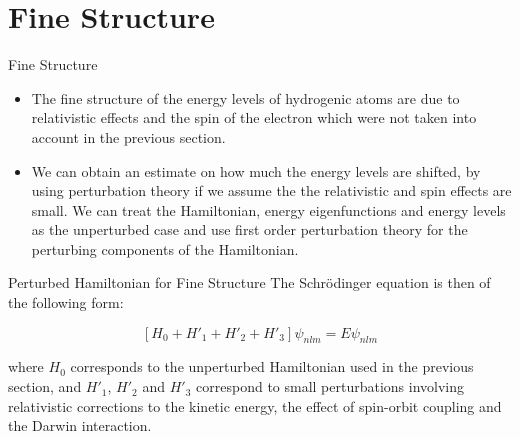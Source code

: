 \documentclass[xcolor=dvipsnames,t]{beamer}
\begin{document}

\section{Fine Structure}
    \begin{frame}{Fine Structure} 

    \begin{itemize} 

    \item The fine structure of the energy levels of hydrogenic atoms are due to relativistic
    effects and the spin of the electron which were not taken into account in the previous
    section. 
    
    \item We can obtain an estimate on how much the energy levels are shifted, by 
    using perturbation theory if we assume the the relativistic and spin effects are 
    small. We can treat the Hamiltonian, energy eigenfunctions and energy levels as
    the unperturbed case and use first order perturbation theory for the perturbing
    components of the Hamiltonian. 
    \end{itemize} 
    \end{frame} 

    \begin{frame}{Perturbed Hamiltonian for Fine Structure} 
    The Schr\"odinger equation is then of the following form:

    \begin{equation} 
        \left[ H_0 + H'_1 + H'_2 + H'_3 \right] \psi_{nlm} = E \psi_{nlm}
    \end{equation} 

    where $H_0$ corresponds to the unperturbed Hamiltonian used in the previous section,
    and $H'_1$, $H'_2$ and $H'_3$ correspond to small perturbations involving relativistic
    corrections to the kinetic energy, the effect of spin-orbit coupling and the Darwin
    interaction. 
    \end{frame} 
    
\end{document}
